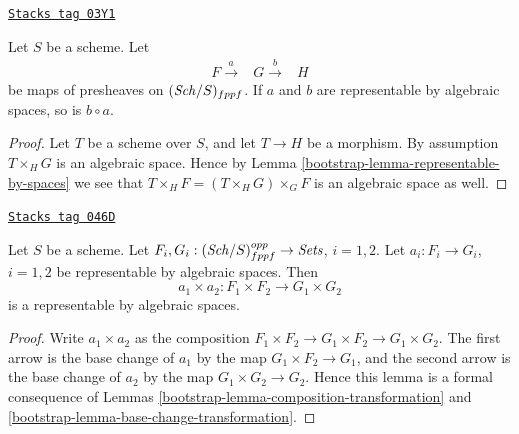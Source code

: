 \begin{lemma}
\label{bootstrap-lemma-composition-transformation}
\href{https://stacks.math.columbia.edu/tag/03Y1}{\texttt{Stacks tag 03Y1}}

Let $S$ be a scheme.
Let
$$
\begin{array}{ccc}F \overset{a}{\longrightarrow} & G \overset{b}{\longrightarrow} & H\end{array}
$$
be maps of presheaves on $(\mathit{Sch}/S)_{fppf}$.
If $a$ and $b$ are representable by algebraic spaces, so is
$b \circ a$.
\end{lemma}

\begin{proof}

Let $T$ be a scheme over $S$, and let $T \to H$ be a morphism.
By assumption $T \times_H G$ is an algebraic space. Hence by
Lemma \ref{bootstrap-lemma-representable-by-spaces}
we see that $T \times_H F = (T \times_H G) \times_G F$ is an
algebraic space as well.
\end{proof}

\begin{lemma}
\label{bootstrap-lemma-product-transformations}
\href{https://stacks.math.columbia.edu/tag/046D}{\texttt{Stacks tag 046D}}

Let $S$ be a scheme.
Let $F_i, G_i : (\mathit{Sch}/S)_{fppf}^{opp} \to \textit{Sets}$, $i = 1, 2$.
Let $a_i : F_i \to G_i$, $i = 1, 2$
be representable by algebraic spaces.
Then
$$
a_1 \times a_2 : F_1 \times F_2 \longrightarrow G_1 \times G_2
$$
is a representable by algebraic spaces.
\end{lemma}

\begin{proof}

Write $a_1 \times a_2$ as the composition
$F_1 \times F_2 \to G_1 \times F_2 \to G_1 \times G_2$.
The first arrow is the base change of $a_1$ by the map
$G_1 \times F_2 \to G_1$, and the second arrow
is the base change of $a_2$ by the map
$G_1 \times G_2 \to G_2$. Hence this lemma is a formal
consequence of Lemmas \ref{bootstrap-lemma-composition-transformation}
and \ref{bootstrap-lemma-base-change-transformation}.
\end{proof}

